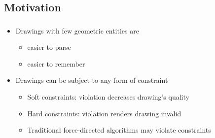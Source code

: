 \subsection{Motivation}
\label{subsect:motivation}

\begin{frame}
  \frametitle{\insertsubsection}
  \begin{itemize}
    \item Drawings with few geometric entities are \begin{itemize}
      \item easier to parse
      \item easier to remember
    \end{itemize}
    \item Drawings can be subject to any form of constraint \begin{itemize}
      \item Soft constraints: violation decreases drawing's quality
      \item Hard constraints: violation renders drawing invalid
      \item Traditional force-directed algorithms may violate constraints
    \end{itemize}
  \end{itemize}
\end{frame}
